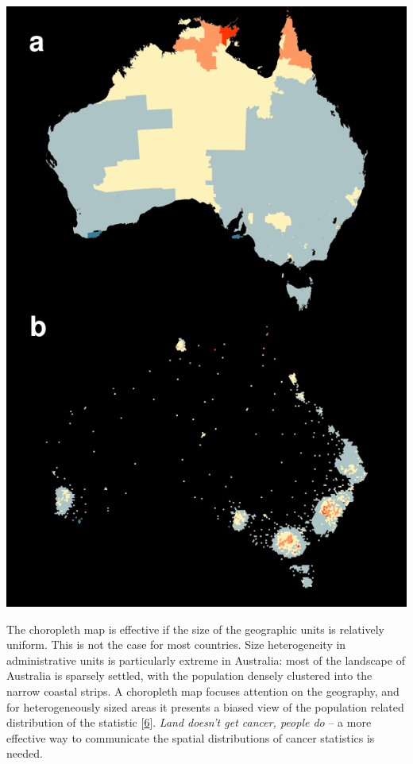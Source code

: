 \documentclass[conference,final,]{IEEEtran}
\makeatletter
\def\maxwidth{\ifdim\Gin@nat@width>\linewidth\linewidth
\else\Gin@nat@width\fi}
\let\Oldincludegraphics\includegraphics
\renewcommand{\includegraphics}[1]{\Oldincludegraphics[width=\maxwidth]{#1}}
\makeatother
\begin{document}
\includegraphics{paper_files/figure-latex/liver-1.pdf}

The choropleth map is effective if the size of the geographic units is relatively uniform. This is not the case for most countries. Size heterogeneity in administrative units is particularly extreme in Australia: most of the landscape of Australia is sparsely settled, with the population densely clustered into the narrow coastal strips. A choropleth map focuses attention on the geography, and for heterogeneously sized areas it presents a biased view of the population related distribution of the statistic {[}\protect\hyperlink{ref-CBATCC}{6}{]}. \emph{Land doesn't get cancer, people do} -- a more effective way to communicate the spatial distributions of cancer statistics is needed.
\end{document}
